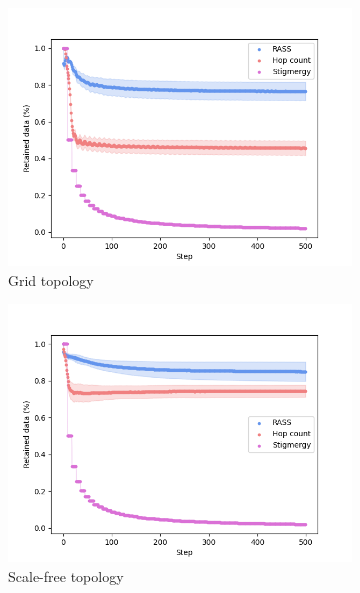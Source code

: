 \begin{figure}
    \centering
    \begin{subfigure}{0.45\textwidth}
        \includegraphics[width=\textwidth]{figures/dora_mesh/grid_reliability.png}
        \caption{Grid topology}
        \label{results:grid_100_reliability}
    \end{subfigure}
    \begin{subfigure}{0.45\textwidth}
        \includegraphics[width=\textwidth]{figures/dora_mesh/scale_reliability.png}
        \caption{Scale-free topology}
        \label{results:scale_100_reliability}
    \end{subfigure}
    \begin{subfigure}{0.45\textwidth}

\end{subfigure}
\end{figure}
